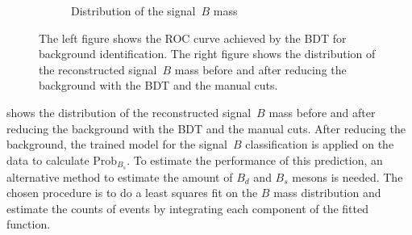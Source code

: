 \begin{figure}
\begin{subfigure}{0.5\textwidth}
        \caption{Distribution of the signal~$B$ mass}
        \label{fig:BKG_reduced}
    \end{subfigure}%
    \caption{The left figure shows the ROC curve achieved by the BDT for background identification. The right figure shows the distribution of the reconstructed signal~$B$ mass before and after reducing the background with the BDT and the manual cuts.}
    \label{fig:BKG_eval}
\end{figure}

 shows the distribution of the reconstructed signal~$B$ mass before and after reducing the background with the BDT and the manual cuts.
After reducing the background, the trained model for the signal~$B$ classification is applied on the data to calculate $\text{Prob}_{B_s}$.
To estimate the performance of this prediction, an alternative method to estimate the amount of $B_d$ and $B_s$ mesons is needed.
The chosen procedure is to do a least squares fit on the $B$ mass distribution and estimate the counts of events by integrating each component of the fitted function.

